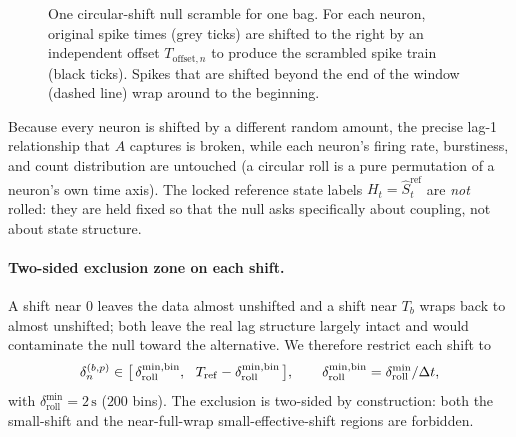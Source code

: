 \documentclass[11pt]{article}
\begin{document}
\begin{figure}[h]
\caption{One circular-shift null scramble for one bag. For each neuron, original spike times (grey ticks) are shifted to the right by an independent offset \(T_{\text{offset},n}\) to produce the scrambled spike train (black ticks). Spikes that are shifted beyond the end of the window (dashed line) wrap around to the beginning.}
\label{fig:circular-shift-null-cartoon}
\end{figure}

Because every neuron is shifted by a different random amount, the precise
lag-1 relationship that \(A\) captures is broken, while each neuron's firing
rate, burstiness, and count distribution are untouched (a circular roll is a
pure permutation of a neuron's own time axis). The locked reference state
labels \(H_t=\hat S^{\text{ref}}_t\) are \emph{not} rolled: they are held
fixed so that the null asks specifically about coupling, not about state
structure.

\paragraph{Two-sided exclusion zone on each shift.} A shift near \(0\) leaves
the data almost unshifted and a shift near \(T_b\) wraps back to almost
unshifted; both leave the real lag structure largely intact and would
contaminate the null toward the alternative. We therefore restrict each
shift to
\[
\delta_n^{(b,p)}\in
\big[\,\delta_{\text{roll}}^{\min,\text{bin}},\ \
T_{\rm ref}-\delta_{\text{roll}}^{\min,\text{bin}}\,\big],
\qquad
\delta_{\text{roll}}^{\min,\text{bin}}=\delta_{\text{roll}}^{\min}/\Delta t,
\]
with \(\delta_{\text{roll}}^{\min}=2\,\text{s}\) (\(200\) bins). The
exclusion is two-sided by construction: both the small-shift and the
near-full-wrap small-effective-shift regions are forbidden.
\end{document}
